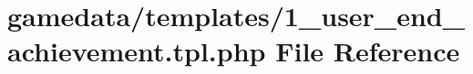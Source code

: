 \hypertarget{1__user__end__achievement_8tpl_8php}{\section{gamedata/templates/1\+\_\+user\+\_\+end\+\_\+achievement.tpl.\+php File Reference}
\label{1__user__end__achievement_8tpl_8php}
}
